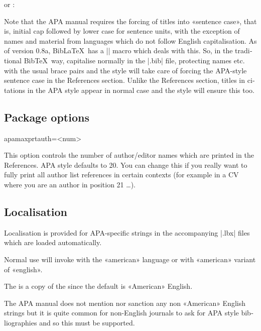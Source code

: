 \documentclass{ltxdockit}
\begin{document}
or :

\begin{ltxcode}
\usepackage{polyglossia}
\setdefaultlanguage[variant=american]{english}
\usepackage{csquotes}
\usepackage[style=apa]{biblatex}
\end{ltxcode}

\noindent Note that the APA manual requires the forcing of titles into
«sentence case», that is, initial cap followed by lower case for sentence
units, with the exception of names and material from languages which do not
follow English capitalisation. As of version 0.8a, Bib\LaTeX\ has a
|\MakeSentenceCase| macro which deals with this. So, in the traditional
Bib\TeX\ way, capitalise normally in the |.bib| file, protecting names etc.
with the usual brace pairs and the style will take care of forcing the
APA-style sentence case in the References section. Unlike the References
section, titles in citations in the APA style appear in normal case and the
style will ensure this too.

\subsection{Package options}\label{opts}

\begin{ltxcode}
apamaxprtauth=<num>
\end{ltxcode}

\noindent This option controls the number of author/editor names which are
printed in the References. APA style defaults to 20. You can change this if
you really want to fully print all author list references in certain
contexts (for example in a CV where you are an author in position 21 \ldots).

\subsection{Localisation}

Localisation is provided for APA-specific strings in the accompanying
|.lbx| files which are loaded automatically.

Normal use will invoke  with the «american» language or
 with «american» variant of «english».

The  is a copy of the  since
the default is «American» English.

The APA manual does not mention nor sanction any non «American» English
strings but it is quite common for non-English journals to ask for APA style
bibliographies and so this must be supported.
\end{document}
